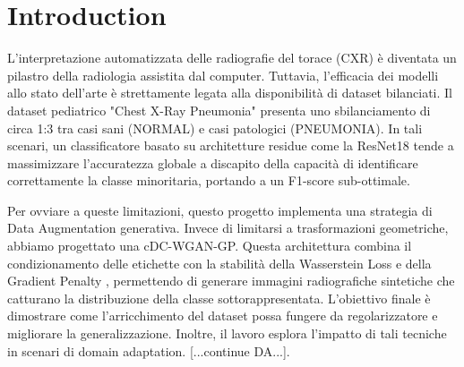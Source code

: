 \section{Introduction}
\label{sec:intro}

L'interpretazione automatizzata delle radiografie del torace (CXR) è diventata un pilastro della radiologia assistita dal computer. Tuttavia, l'efficacia dei modelli allo stato dell'arte è strettamente legata alla disponibilità di dataset bilanciati. Il dataset pediatrico "Chest X-Ray Pneumonia" \cite{kermany2018identifying} presenta uno sbilanciamento di circa 1:3 tra casi sani (NORMAL) e casi patologici (PNEUMONIA). In tali scenari, un classificatore basato su architetture residue come la ResNet18 \cite{He_2016_CVPR} tende a massimizzare l'accuratezza globale a discapito della capacità di identificare correttamente la classe minoritaria, portando a un F1-score sub-ottimale.

Per ovviare a queste limitazioni, questo progetto implementa una strategia di Data Augmentation generativa. Invece di limitarsi a trasformazioni geometriche, abbiamo progettato una cDC-WGAN-GP. Questa architettura combina il condizionamento delle etichette \cite{mirza2014conditionalgenerativeadversarialnets} con la stabilità della Wasserstein Loss \cite{arjovsky2017wasserstein} e della Gradient Penalty \cite{gulrajani2017improved}, permettendo di generare immagini radiografiche sintetiche che catturano la distribuzione della classe sottorappresentata. L'obiettivo finale è dimostrare come l'arricchimento del dataset possa fungere da regolarizzatore e migliorare la generalizzazione. Inoltre, il lavoro esplora l'impatto di tali tecniche in scenari di domain adaptation. [...continue DA...].

